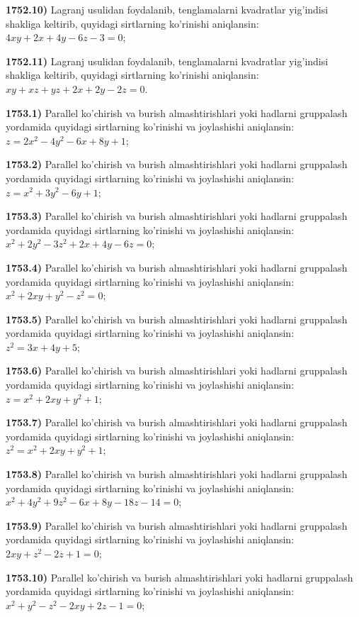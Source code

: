 \textbf{1752.10)} Lagranj usulidan foydalanib, tenglamalarni kvadratlar yig'indisi shakliga keltirib, quyidagi sirtlarning ko'rinishi aniqlansin: \(4xy + 2x + 4y - 6z - 3 = 0\);

\textbf{1752.11)} Lagranj usulidan foydalanib, tenglamalarni kvadratlar yig'indisi shakliga keltirib, quyidagi sirtlarning ko'rinishi aniqlansin: \(xy + xz + yz + 2x + 2y - 2z = 0\).

\textbf{1753.1)} Parallel ko'chirish va burish almashtirishlari yoki hadlarni gruppalash yordamida quyidagi sirtlarning ko'rinishi va joylashishi aniqlansin: \(z = 2x^{2} - 4y^{2} - 6x + 8y + 1\);

\textbf{1753.2)} Parallel ko'chirish va burish almashtirishlari yoki hadlarni gruppalash yordamida quyidagi sirtlarning ko'rinishi va joylashishi aniqlansin: \(z = x^{2} + 3y^{2} - 6y + 1\);

\textbf{1753.3)} Parallel ko'chirish va burish almashtirishlari yoki hadlarni gruppalash yordamida quyidagi sirtlarning ko'rinishi va joylashishi aniqlansin: \(x^{2} + 2y^{2} - 3z^{2} + 2x + 4y - 6z = 0\);

\textbf{1753.4)} Parallel ko'chirish va burish almashtirishlari yoki hadlarni gruppalash yordamida quyidagi sirtlarning ko'rinishi va joylashishi aniqlansin: \(x^{2} + 2xy + y^{2} - z^{2} = 0\);

\textbf{1753.5)} Parallel ko'chirish va burish almashtirishlari yoki hadlarni gruppalash yordamida quyidagi sirtlarning ko'rinishi va joylashishi aniqlansin: \(z^{2} = 3x + 4y + 5\);

\textbf{1753.6)} Parallel ko'chirish va burish almashtirishlari yoki hadlarni gruppalash yordamida quyidagi sirtlarning ko'rinishi va joylashishi aniqlansin: \(z = x^{2} + 2xy + y^{2} + 1\);

\textbf{1753.7)} Parallel ko'chirish va burish almashtirishlari yoki hadlarni gruppalash yordamida quyidagi sirtlarning ko'rinishi va joylashishi aniqlansin: \(z^{2} = x^{2} + 2xy + y^{2} + 1\);

\textbf{1753.8)} Parallel ko'chirish va burish almashtirishlari yoki hadlarni gruppalash yordamida quyidagi sirtlarning ko'rinishi va joylashishi aniqlansin: \(x^{2} + 4y^{2} + 9z^{2} - 6x + 8y - 18z - 14 = 0\);

\textbf{1753.9)} Parallel ko'chirish va burish almashtirishlari yoki hadlarni gruppalash yordamida quyidagi sirtlarning ko'rinishi va joylashishi aniqlansin: \(2xy + z^{2} - 2z + 1 = 0\);

\textbf{1753.10)} Parallel ko'chirish va burish almashtirishlari yoki hadlarni gruppalash yordamida quyidagi sirtlarning ko'rinishi va joylashishi aniqlansin: \(x^{2} + y^{2} - z^{2} - 2xy + 2z - 1 = 0\);

